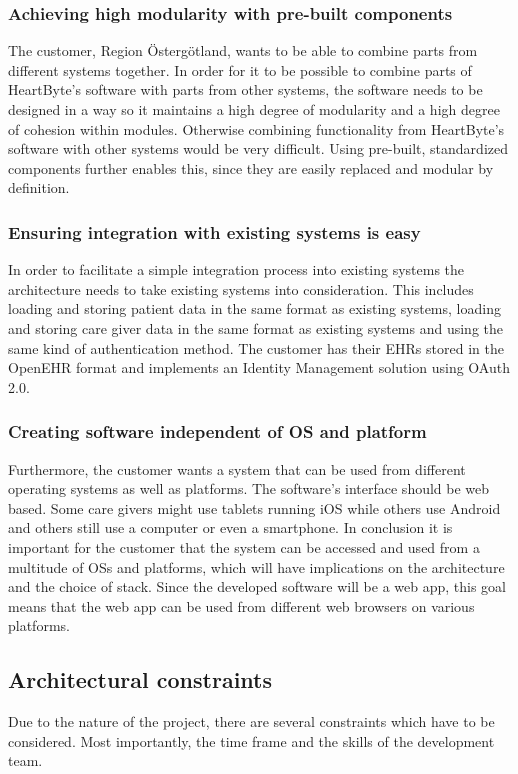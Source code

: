 \documentclass{article}
\begin{document}
\subsubsection{Achieving high modularity with pre-built components}
The customer, Region Östergötland, wants to be able to combine parts from different systems together. In order for it to be possible to combine parts of HeartByte's software with parts from other systems, the software needs to be designed in a way so it maintains a high degree of modularity and a high degree of cohesion within modules. Otherwise combining functionality from HeartByte's software with other systems would be very difficult. Using pre-built, standardized components further enables this, since they are easily replaced and modular by definition.

\subsubsection{Ensuring integration with existing systems is easy}
In order to facilitate a simple integration process into existing systems the architecture needs to take existing systems into consideration. This includes loading and storing patient data in the same format as existing systems, loading and storing care giver data in the same format as existing systems and using the same kind of authentication method. The customer has their EHRs stored in the OpenEHR format and implements an Identity Management solution using OAuth 2.0.

\subsubsection{Creating software independent of OS and platform}
Furthermore, the customer wants a system that can be used from different operating systems as well as platforms. The software's interface should be web based. Some care givers might use tablets running iOS while others use Android and others still use a computer or even a smartphone. In conclusion it is important for the customer that the system can be accessed and used from a multitude of OSs and platforms, which will have implications on the architecture and the choice of stack. Since the developed software will be a web app, this goal means that the web app can be used from different web browsers on various platforms.


\subsection{Architectural constraints}
Due to the nature of the project, there are several constraints which have to be considered. Most importantly, the time frame and the skills of the development team.
\end{document}
